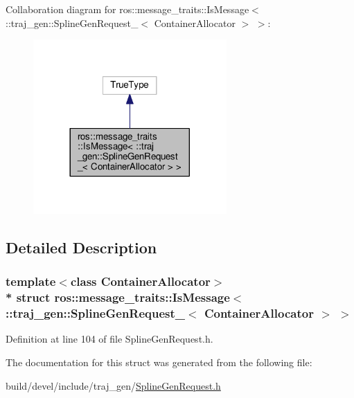 Collaboration diagram for ros\+:\+:message\+\_\+traits\+:\+:Is\+Message$<$ \+:\+:traj\+\_\+gen\+:\+:Spline\+Gen\+Request\+\_\+$<$ Container\+Allocator $>$ $>$\+:
\nopagebreak
\begin{figure}[H]
\begin{center}
\leavevmode
\includegraphics[width=209pt]{structros_1_1message__traits_1_1_is_message_3_01_1_1traj__gen_1_1_spline_gen_request___3_01_contab9160d880bb815800bd2540f49d172b}
\end{center}
\end{figure}


\subsection{Detailed Description}
\subsubsection*{template$<$class Container\+Allocator$>$\\*
struct ros\+::message\+\_\+traits\+::\+Is\+Message$<$ \+::traj\+\_\+gen\+::\+Spline\+Gen\+Request\+\_\+$<$ Container\+Allocator $>$ $>$}



Definition at line 104 of file Spline\+Gen\+Request.\+h.



The documentation for this struct was generated from the following file\+:\begin{DoxyCompactItemize}
\item 
build/devel/include/traj\+\_\+gen/\hyperlink{_spline_gen_request_8h}{Spline\+Gen\+Request.\+h}\end{DoxyCompactItemize}
